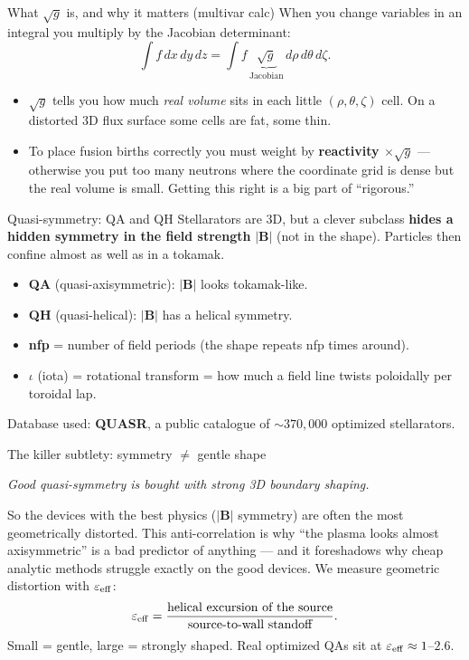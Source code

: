 \documentclass[11pt,aspectratio=169]{beamer}
\newcommand{\key}[1]{\textcolor{key}{\textbf{#1}}}
\newcommand{\qq}[1]{\begin{center}\emph{#1}\end{center}}
\begin{document}
\begin{frame}{What $\sqrt{g}$ is, and why it matters (multivar calc)}
When you change variables in an integral you multiply by the Jacobian determinant:
\[ \int f\,dx\,dy\,dz = \int f\,\underbrace{\sqrt{g}}_{\text{Jacobian}}\,d\rho\,d\theta\,d\zeta.\]
\begin{itemize}
\item $\sqrt{g}$ tells you how much \emph{real volume} sits in each little
$(\rho,\theta,\zeta)$ cell. On a distorted 3D flux surface some cells are fat, some thin.
\item To place fusion births correctly you must weight by \key{reactivity $\times \sqrt{g}$}
--- otherwise you put too many neutrons where the coordinate grid is dense but the real
volume is small. Getting this right is a big part of ``rigorous.''
\end{itemize}
\end{frame}

\begin{frame}{Quasi-symmetry: QA and QH}
Stellarators are 3D, but a clever subclass \key{hides a hidden symmetry in the field
strength} $|\mathbf{B}|$ (not in the shape). Particles then confine almost as well as in a
tokamak.
\begin{itemize}
\item \key{QA} (quasi-axisymmetric): $|\mathbf{B}|$ looks tokamak-like.
\item \key{QH} (quasi-helical): $|\mathbf{B}|$ has a helical symmetry.
\item \key{nfp} = number of field periods (the shape repeats nfp times around).
\item \key{$\iota$} (iota) = rotational transform = how much a field line twists poloidally
per toroidal lap.
\end{itemize}
Database used: \key{QUASR}, a public catalogue of $\sim\!370{,}000$ optimized stellarators.
\end{frame}

\begin{frame}{The killer subtlety: symmetry $\neq$ gentle shape}
\qq{Good quasi-symmetry is \emph{bought} with strong 3D boundary shaping.}
So the devices with the best physics ($|\mathbf{B}|$ symmetry) are often the most
geometrically distorted. This anti-correlation is why ``the plasma looks almost
axisymmetric'' is a bad predictor of anything --- and it foreshadows why cheap analytic
methods struggle exactly on the good devices.
\vfill
We measure geometric distortion with \key{$\varepsilon_{\rm eff}$}:
\[ \varepsilon_{\rm eff} = \frac{\text{helical excursion of the source}}{\text{source-to-wall standoff}}.\]
Small = gentle, large = strongly shaped. Real optimized QAs sit at
$\varepsilon_{\rm eff}\approx 1$--$2.6$.
\end{frame}
\end{document}
